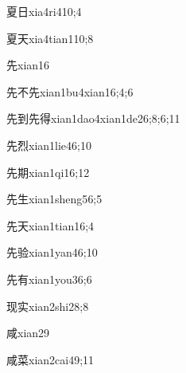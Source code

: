 \begin{verbete}{夏日}{xia4ri4}{10;4}
\end{verbete}
\begin{verbete}{夏天}{xia4tian1}{10;8}
\end{verbete}
\begin{verbete}{先}{xian1}{6}
\end{verbete}
\begin{verbete}{先不先}{xian1bu4xian1}{6;4;6}
\end{verbete}
\begin{verbete}{先到先得}{xian1dao4xian1de2}{6;8;6;11}
\end{verbete}
\begin{verbete}{先烈}{xian1lie4}{6;10}
\end{verbete}
\begin{verbete}{先期}{xian1qi1}{6;12}
\end{verbete}
\begin{verbete}{先生}{xian1sheng5}{6;5}
\end{verbete}
\begin{verbete}{先天}{xian1tian1}{6;4}
\end{verbete}
\begin{verbete}{先验}{xian1yan4}{6;10}
\end{verbete}
\begin{verbete}{先有}{xian1you3}{6;6}
\end{verbete}
\begin{verbete}{现实}{xian2shi2}{8;8}
\end{verbete}
\begin{verbete}{咸}{xian2}{9}
\end{verbete}
\begin{verbete}{咸菜}{xian2cai4}{9;11}
\end{verbete}
